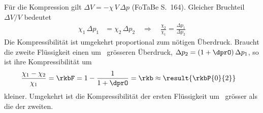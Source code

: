 Für die Kompression gilt $\Delta V = -\chi\,V\,\Delta p$ (FoTaBe S.~164). Gleicher Bruchteil $\Delta V/V$ bedeutet
\begin{align}
 \chi_1\,\Delta p_1 &= \chi_2\,\Delta p_2 \quad\Rightarrow\quad \frac{\chi_2}{\chi_1} = \frac{\Delta p_1}{\Delta p_2}
\end{align}
Die Kompressibilität ist umgekehrt proportional zum nötigen Überdruck. Braucht die zweite Flüssigkeit einen um \dprO\ grösseren Überdruck, $\Delta p_2 = \left(1+\dprO\right)\Delta p_1$, so ist ihre Kompressibilität um
\begin{align}
 \frac{\chi_1-\chi_2}{\chi_1} &= \rkbF = 1-\frac{1}{1+\dprO} = \rkb \approx \result{\rkbP{0}{2}}
\end{align}
kleiner. Umgekehrt ist die Kompressibilität der ersten Flüssigkeit um \dprO\ grösser als die der zweiten.
